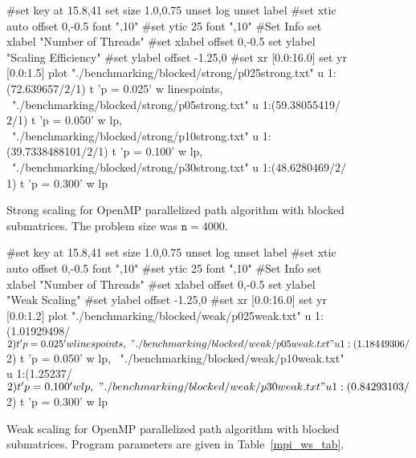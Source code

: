 \documentclass[11pt]{article}
\begin{document}
\begin{figure}[h]
	\begin{center}
		\begin{gnuplot}[terminal=cairolatex, terminaloptions= color] 
			#set key at 15.8,41
			set size 1.0,0.75              
			unset log                          
			unset label                          
			#set xtic auto offset 0,-0.5 font ",10"                     
			#set ytic 25 font ",10" 
			#Set Info
			set xlabel "Number of Threads"
			#set xlabel offset 0,-0.5
			set ylabel "Scaling Efficiency"
			#set ylabel offset -1.25,0
			#set xr [0.0:16.0]
			set yr [0.0:1.5]
			plot "./benchmarking/blocked/strong/p025strong.txt" u 1:(72.639657/$2/$1) t 'p = 0.025' w linespoints, \
			"./benchmarking/blocked/strong/p05strong.txt" u 1:(59.38055419/$2/$1) t 'p = 0.050' w lp, \
			"./benchmarking/blocked/strong/p10strong.txt" u 1:(39.7338488101/$2/$1) t 'p = 0.100' w lp, \
			"./benchmarking/blocked/strong/p30strong.txt" u 1:(48.6280469/$2/$1) t 'p = 0.300' w lp
		\end{gnuplot}
		\caption{Strong scaling for OpenMP parallelized path algorithm with blocked submatrices. The problem size was $\mathtt{n} = 4000$.}
		\label{blocked_ss}
	\end{center}
\end{figure}


\begin{figure}[h]
	\begin{center}
		\begin{gnuplot}[terminal=cairolatex, terminaloptions= color] 
			#set key at 15.8,41
			set size 1.0,0.75              
			unset log                          
			unset label                          
			#set xtic auto offset 0,-0.5 font ",10"                     
			#set ytic 25 font ",10" 
			#Set Info
			set xlabel "Number of Threads"
			#set xlabel offset 0,-0.5
			set ylabel "Weak Scaling"
			#set ylabel offset -1.25,0
			#set xr [0.0:16.0]
			set yr [0.0:1.2]
			plot "./benchmarking/blocked/weak/p025weak.txt" u 1:(1.01929498/$2) t 'p = 0.025' w linespoints, \
			"./benchmarking/blocked/weak/p05weak.txt" u 1:(1.18449306/$2) t 'p = 0.050' w lp, \
			"./benchmarking/blocked/weak/p10weak.txt" u 1:(1.25237/$2) t 'p = 0.100' w lp, \
			"./benchmarking/blocked/weak/p30weak.txt" u 1:(0.84293103/$2) t 'p = 0.300' w lp
		\end{gnuplot}
		\caption{Weak scaling for OpenMP parallelized path algorithm with blocked submatrices. Program parameters are given in Table~\ref{mpi_ws_tab}.}
		\label{blocked_ws}
	\end{center}
\end{figure}
\end{document}
